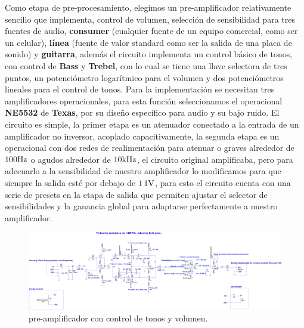 
Como etapa de pre-procesamiento, elegimos un pre-amplificador relativamente sencillo que implementa, control de volumen, selección de sensibilidad para tres fuentes de audio, \textbf{consumer} (cualquier fuente de un equipo comercial, como ser un celular), \textbf{línea} (fuente de valor standard como ser la salida de una placa de sonido) y \textbf{guitarra}, además el circuito implementa un control básico de tonos, con control de \textbf{Bass} y \textbf{Trebel}, con lo cual se tiene una llave selectora de tres puntos, un potenciómetro logarítmico para el volumen y dos potenciómetros lineales para el control de tonos. Para la implementación se necesitan tres amplificadores operacionales, para esta función seleccionamos el operacional \textbf{NE5532} de \textbf{Texas}, por su diseño específico para audio y su bajo ruido. El circuito es simple, la primer etapa es un atenuador conectado a la entrada de un amplificador no inversor, acoplado capacitivamente, la segunda etapa es un operacional con dos redes de realimentación para atenuar o graves alrededor de $100 \si[per-mode=symbol]{\hertz}$ o agudos alrededor de $10 \si[per-mode=symbol]{\kilo\hertz}$, el circuito original amplificaba, pero para adecuarlo a la sensibilidad de nuestro amplificador lo modificamos para que siempre la salida esté por debajo de $\si[per-mode=symbol]{1.1 \volt}$, para esto el circuito cuenta con una serie de presets en la etapa de salida que permiten ajustar el selector de sensibilidades y la ganancia global para adaptarse perfectamente a nuestro amplificador.


\vfill

\clearpage


\begin{figure}[H]
	\centering
	\includegraphics[width=0.7\paperheight, angle=90]{img/preamp.png}
	\caption{pre-amplificador con control de tonos y volumen.}
	\label{fig:power_supply}
\end{figure}